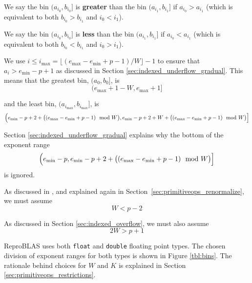     We say the bin $(a_{i_0}, b_{i_0}]$ is \textbf{greater} than the bin
    $(a_{i_1}, b_{i_1}]$ if $a_{i_0} > a_{i_1}$ (which is equivalent to both
    $b_{i_0} > b_{i_1}$ and $i_0 < i_1$).

    We say the bin $(a_{i_0}, b_{i_0}]$ is \textbf{less} than the bin
    $(a_{i_1}, b_{i_1}]$ if $a_{i_0} < a_{i_1}$ (which is equivalent to both
    $b_{i_0} < b_{i_1}$ and $i_0 > i_1$).

    We use $i \leq i_{\max} = \lfloor(e_{\max} - e_{\min} + p - 1)/W\rfloor - 1$
    to ensure that $a_i > e_{\min} - p + 1$ as discussed in Section
    \ref{sec:indexed_underflow_gradual}. This means that the greatest bin,
    $(a_{0}, b_{0}]$, is
    \begin{equation}
      (e_{\max} + 1 - W, e_{\max} + 1]
      \label{eq:binmax}
    \end{equation}

    and the least bin, $(a_{i_{\max}}, b_{i_{\max}}]$, is
    \begin{equation}
      \Bigl(e_{\min} - p + 2 + \bigl((e_{\max} - e_{\min} + p - 1)\mod W\bigr),
      e_{\min} - p + 2 + W + \bigl((e_{\max} - e_{\min} + p - 1)\mod W\bigr)\Bigr]
      \label{eq:binmin}
    \end{equation}

    Section \ref{sec:indexed_underflow_gradual} explains why the bottom of the exponent range
    \begin{equation*}
    \Bigl(e_{\min} - p, e_{\min} - p + 2 + \bigl((e_{\max} - e_{\min} + p - 1) \mod W\bigr)\Bigr]
    \end{equation*}
    is ignored.

    As discussed in \cite{repsum}, and explained again in Section~\ref{sec:primitiveops_renormalize},
    we must assume
    \begin{equation}
      W < p - 2
      \label{eq:wupper}
    \end{equation}

    As discussed in Section \ref{sec:indexed_overflow}, we must also assume
    \begin{equation}
      2 W > p + 1
      \label{eq:wlower}
    \end{equation}

    ReproBLAS uses both \texttt{float} and \texttt{double} floating point
    types. The chosen division of exponent ranges for both types is shown in
    Figure \ref{tbl:bins}. The rationale behind choices for $W$ and $K$ is explained in Section \ref{sec:primitiveops_restrictions}.

